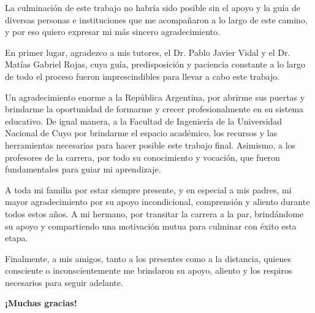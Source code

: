 
La culminación de este trabajo no habría sido posible sin el apoyo y la guía de diversas personas e instituciones que me acompañaron a lo largo de este camino, y por eso quiero expresar mi más sincero agradecimiento.

En primer lugar, agradezco a mis tutores, el Dr. Pablo Javier Vidal y el Dr. Matías Gabriel Rojas, cuya guía, predisposición y paciencia constante a lo largo de todo el proceso fueron imprescindibles para llevar a cabo este trabajo.

Un agradecimiento enorme a la República Argentina, por abrirme sus puertas y brindarme la oportunidad de formarme y crecer profesionalmente en su sistema educativo. De igual manera, a la Facultad de Ingeniería de la Universidad Nacional de Cuyo por brindarme el espacio académico, los recursos y las herramientas necesarias para hacer posible este trabajo final. Asimismo, a los profesores de la carrera, por todo su conocimiento y vocación, que fueron fundamentales para guiar mi aprendizaje.

A toda mi familia por estar siempre presente, y en especial a mis padres, mi mayor agradecimiento por su apoyo incondicional, comprensión y aliento durante todos estos años. A mi hermano, por transitar la carrera a la par, brindándome su apoyo y compartiendo una motivación mutua para culminar con éxito esta etapa.

Finalmente, a mis amigos, tanto a los presentes como a la distancia, quienes consciente o inconscientemente me brindaron su apoyo, aliento y los respiros necesarios para seguir adelante.

\vspace{1.5cm}
\begin{center}
    \large\textbf{¡Muchas gracias!}
\end{center}



